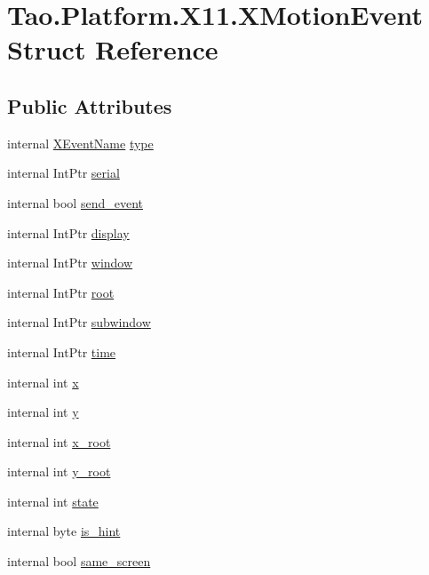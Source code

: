 \hypertarget{struct_tao_1_1_platform_1_1_x11_1_1_x_motion_event}{
\section{Tao.Platform.X11.XMotionEvent Struct Reference}
\label{struct_tao_1_1_platform_1_1_x11_1_1_x_motion_event}
}
\subsection*{Public Attributes}
\begin{DoxyCompactItemize}
\item 
internal \hyperlink{namespace_tao_1_1_platform_1_1_x11_aff81ed5b8778e1ea8e872861dff9f146}{XEventName} \hyperlink{struct_tao_1_1_platform_1_1_x11_1_1_x_motion_event_a601bb97779179695f235edc7ab500364}{type}
\item 
internal IntPtr \hyperlink{struct_tao_1_1_platform_1_1_x11_1_1_x_motion_event_adfb28f45a4d44a8e4628f63bddf3d98d}{serial}
\item 
internal bool \hyperlink{struct_tao_1_1_platform_1_1_x11_1_1_x_motion_event_ac3a626a163c83a7d801caf0c3a86f6ce}{send\_\-event}
\item 
internal IntPtr \hyperlink{struct_tao_1_1_platform_1_1_x11_1_1_x_motion_event_af0804991b2898ab556323c117eda551b}{display}
\item 
internal IntPtr \hyperlink{struct_tao_1_1_platform_1_1_x11_1_1_x_motion_event_ad107d53e77dc9c831805b83a4348533d}{window}
\item 
internal IntPtr \hyperlink{struct_tao_1_1_platform_1_1_x11_1_1_x_motion_event_a4cd158f9a53b85239b7b35f18f14e703}{root}
\item 
internal IntPtr \hyperlink{struct_tao_1_1_platform_1_1_x11_1_1_x_motion_event_a556822fc05e4f2c511984aeb70108500}{subwindow}
\item 
internal IntPtr \hyperlink{struct_tao_1_1_platform_1_1_x11_1_1_x_motion_event_a3b73ce6cea9c30f5fe6fc7cdf7bfd625}{time}
\item 
internal int \hyperlink{struct_tao_1_1_platform_1_1_x11_1_1_x_motion_event_a05fc44eaec2cd27e20cc9ffd8632fe17}{x}
\item 
internal int \hyperlink{struct_tao_1_1_platform_1_1_x11_1_1_x_motion_event_a7e21575ec60bc355b9dba0c661ba9106}{y}
\item 
internal int \hyperlink{struct_tao_1_1_platform_1_1_x11_1_1_x_motion_event_a6c7a0b4a269d5bcf3a2d9c142224e0fc}{x\_\-root}
\item 
internal int \hyperlink{struct_tao_1_1_platform_1_1_x11_1_1_x_motion_event_a65c2245f4466b6bc4758568792d9f652}{y\_\-root}
\item 
internal int \hyperlink{struct_tao_1_1_platform_1_1_x11_1_1_x_motion_event_a91133a65ec82b501ef5f1da8b41a749f}{state}
\item 
internal byte \hyperlink{struct_tao_1_1_platform_1_1_x11_1_1_x_motion_event_a43c7fdd214b4939e904565fe9cd92380}{is\_\-hint}
\item 
internal bool \hyperlink{struct_tao_1_1_platform_1_1_x11_1_1_x_motion_event_ad9b544bcee98e1d96ea118c6934efe34}{same\_\-screen}
\end{DoxyCompactItemize}


